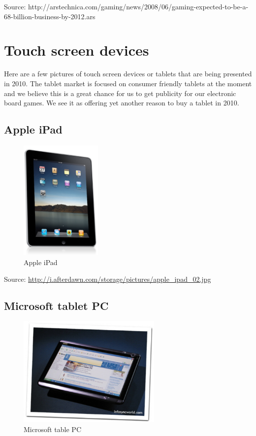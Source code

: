 \documentclass[12pt,a4paper]{article}
\begin{document}
Source: http://arstechnica.com/gaming/news/2008/06/gaming-expected-to-be-a-68-billion-business-by-2012.ars

\section{Touch screen devices}
Here are a few pictures of touch screen devices or tablets that are being presented in 2010. The tablet market is focused on consumer friendly tablets at the moment and we believe this is a great chance for us to get publicity for our electronic board games. We see it as offering yet another reason to buy a tablet in 2010.

\subsection{Apple iPad}

\begin{figure}[H]
  \centering
  \includegraphics[width=4cm]{pic/bplan_03.pdf}
  \caption{Apple iPad}
  \label{fig:dev1}
\end{figure}

Source: \url{http://i.afterdawn.com/storage/pictures/apple_ipad_02.jpg}

\subsection{Microsoft tablet PC}

\begin{figure}[H]
  \centering
  \includegraphics[width=7cm]{pic/bplan_04.pdf}
  \caption{Microsoft table PC}
  \label{fig:dev2}
\end{figure}
\end{document}
